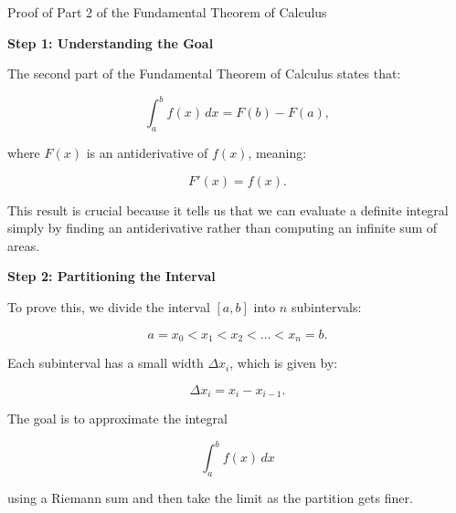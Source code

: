 \documentclass{beamer}
\begin{document}
\begin{frame}{Proof of Part 2 of the Fundamental Theorem of Calculus}

\textbf{Step 1: Understanding the Goal}

The second part of the Fundamental Theorem of Calculus states that:

\[
\int_{a}^{b} f(x) \,dx = F(b) - F(a),
\]

where \( F(x) \) is an antiderivative of \( f(x) \), meaning:

\[
F'(x) = f(x).
\]

This result is crucial because it tells us that we can evaluate a definite integral simply by finding an antiderivative rather than computing an infinite sum of areas.

\end{frame}
\newpage

\begin{frame}
\textbf{Step 2: Partitioning the Interval}

To prove this, we divide the interval \([a, b]\) into \( n \) subintervals:

\[
a = x_0 < x_1 < x_2 < \dots < x_n = b.
\]

Each subinterval has a small width \( \Delta x_i \), which is given by:

\[
\Delta x_i = x_i - x_{i-1}.
\]

The goal is to approximate the integral 

\[
\int_{a}^{b} f(x) \,dx
\]

using a Riemann sum and then take the limit as the partition gets finer.

\end{frame}
\newpage
\end{document}
